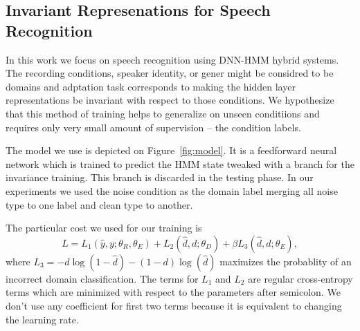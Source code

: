 \documentclass{article}
\begin{document}
\subsection{Invariant Represenations for Speech Recognition}
\label{sec:invariant-speech}

In this work we focus on speech recognition using DNN-HMM hybrid systems. The
recording conditions, speaker identity, or gener might be considred to be domains
and adptation task corresponds to making the hidden layer representations be 
invariant with respect to those conditions. We hypothesize that this method of
training helps to generalize on unseen conditiions and requires only very small
amount of supervision -- the condition labels.  

The model we use is depicted on Figure~\ref{fig:model}. It is a feedforward neural network
which is trained to predict the HMM state tweaked with a branch for the invariance
training. This branch is discarded in the testing phase. In our experiments we
used the noise condition as the domain label merging all noise type to one label
and clean type to another.

The particular cost we used for our training is
    \begin{equation}
        L = L_1(\hat{y}, y; \theta_R, \theta_E) + 
        L_2(\hat{d}, d; \theta_D) +
        \beta L_3(\hat{d}, d; \theta_E),
        \label{eq:cost}
    \end{equation}
where $L_3 = - d\log(1 - \hat{d}) - (1-d)\log(\hat{d})$ maximizes the probablity
of an incorrect domain classification. The terms for $L_1$ and $L_2$ are 
regular cross-entropy terms which are minimized with respect to the parameters
after semicolon.
We don't use any coefficient for first two terms because it is equivalent to 
changing the learning rate.
\end{document}
